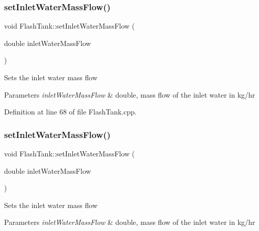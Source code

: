 \subsubsection{\texorpdfstring{set\+Inlet\+Water\+Mass\+Flow()}{setInletWaterMassFlow()}\hspace{0.1cm}{\footnotesize\ttfamily [2/3]}}
{\footnotesize\ttfamily void Flash\+Tank\+::set\+Inlet\+Water\+Mass\+Flow (\begin{DoxyParamCaption}\item[{double}]{inlet\+Water\+Mass\+Flow }\end{DoxyParamCaption})}

Sets the inlet water mass flow 
\begin{DoxyParams}{Parameters}
{\em inlet\+Water\+Mass\+Flow} & double, mass flow of the inlet water in kg/hr \\
\hline
\end{DoxyParams}


Definition at line 68 of file Flash\+Tank.\+cpp.

\mbox{\label{class_flash_tank_a2bcbd92d39ef3c760bdd65066ba3d34a}} 
\subsubsection{\texorpdfstring{set\+Inlet\+Water\+Mass\+Flow()}{setInletWaterMassFlow()}\hspace{0.1cm}{\footnotesize\ttfamily [3/3]}}
{\footnotesize\ttfamily void Flash\+Tank\+::set\+Inlet\+Water\+Mass\+Flow (\begin{DoxyParamCaption}\item[{double}]{inlet\+Water\+Mass\+Flow }\end{DoxyParamCaption})}

Sets the inlet water mass flow 
\begin{DoxyParams}{Parameters}
{\em inlet\+Water\+Mass\+Flow} & double, mass flow of the inlet water in kg/hr \\
\hline
\end{DoxyParams}
\mbox{\label{class_flash_tank_aed0991a7902401d110fb2f4b472326f5}} 
